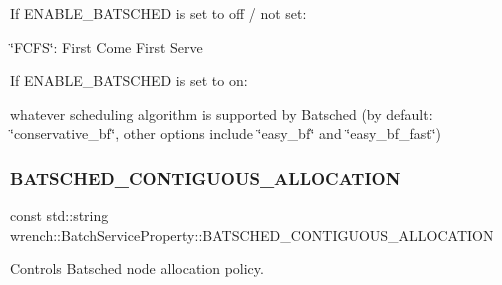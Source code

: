 \begin{DoxyItemize}
\item If E\+N\+A\+B\+L\+E\+\_\+\+B\+A\+T\+S\+C\+H\+ED is set to off / not set\+:
\begin{DoxyItemize}
\item \char`\"{}\+F\+C\+F\+S\char`\"{}\+: First Come First Serve
\end{DoxyItemize}
\item If E\+N\+A\+B\+L\+E\+\_\+\+B\+A\+T\+S\+C\+H\+ED is set to on\+:
\begin{DoxyItemize}
\item whatever scheduling algorithm is supported by Batsched (by default\+: \char`\"{}conservative\+\_\+bf\char`\"{}, other options include \char`\"{}easy\+\_\+bf\char`\"{} and \char`\"{}easy\+\_\+bf\+\_\+fast\char`\"{}) 
\end{DoxyItemize}
\end{DoxyItemize}\mbox{\label{classwrench_1_1_batch_service_property_ac21c68a5a297ba00fc919cec0d90c18d}} 
\subsubsection{\texorpdfstring{B\+A\+T\+S\+C\+H\+E\+D\+\_\+\+C\+O\+N\+T\+I\+G\+U\+O\+U\+S\+\_\+\+A\+L\+L\+O\+C\+A\+T\+I\+ON}{BATSCHED\_CONTIGUOUS\_ALLOCATION}}
{\footnotesize\ttfamily const std\+::string wrench\+::\+Batch\+Service\+Property\+::\+B\+A\+T\+S\+C\+H\+E\+D\+\_\+\+C\+O\+N\+T\+I\+G\+U\+O\+U\+S\+\_\+\+A\+L\+L\+O\+C\+A\+T\+I\+ON\hspace{0.3cm}{\ttfamily [static]}}



Controls Batsched node allocation policy. 



